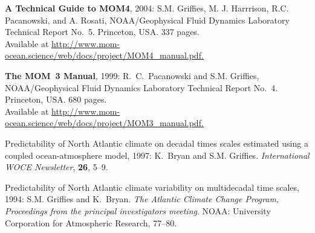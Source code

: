 \begin{etaremune}
\item {\bf A Technical Guide to MOM4}, 2004: S.M. Grif\/f\/ies, M. J. Harrrison, R.C. Pacanowski, and A. Rosati, NOAA/Geophysical Fluid Dynamics Laboratory Technical Report No.\ 5. Princeton, USA. 337 pages.  \\
Available at  \href{http://www.mom-ocean.science/web/docs/project/MOM4_manual.pdf}{http://www.mom-ocean.science/web/docs/project/MOM4\_manual.pdf.}

\item {\bf The MOM~3 Manual}, 1999: R.\ C.\ Pacanowski and S.M. Grif\/f\/ies,  NOAA/Geophysical Fluid Dynamics Laboratory Technical Report No.\ 4. Princeton, USA.  680 pages.  \\ Available at
\href{http://www.mom-ocean.science/web/docs/project/MOM3_manual.pdf}{http://www.mom-ocean.science/web/docs/project/MOM3\_manual.pdf.}
  
\item Predictability of North Atlantic climate on decadal times scales estimated using a coupled ocean-atmosphere model, 1997: K.\ Bryan and S.M. Grif\/f\/ies.  {\em International WOCE Newsletter}, {\bf 26}, 5--9.

\item Predictability of North Atlantic climate variability on multidecadal time scales, 1994: S.M. Grif\/f\/ies and K.\ Bryan.  {\em The Atlantic Climate Change Program, Proceedings from the principal investigators meeting}.  NOAA: University Corporation for Atmospheric Research, 77--80.

\end{etaremune}

